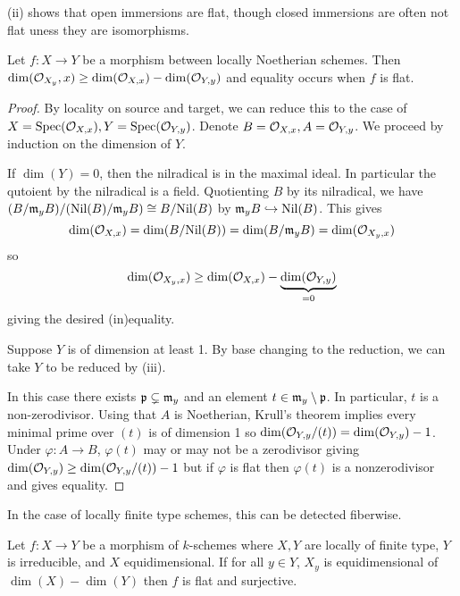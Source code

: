 \begin{example}
     (ii) shows that open immersions are flat, though closed immersions are often not flat uness they are isomorphisms. 
\end{example}
\begin{proposition}\label{prop: dimension criterion for flatness}
    Let $f:X\to Y$ be a morphism between locally Noetherian schemes. Then $\dim(\mathcal{O}_{X_{y}},x)\geq\dim(\mathcal{O}_{X,x})-\dim(\mathcal{O}_{Y,y})$ and equality occurs when $f$ is flat.
\end{proposition}
\begin{proof}
    By locality on source and target, we can reduce this to the case of $X=\operatorname{Spec}(\mathcal{O}_{X,x}),Y=\operatorname{Spec}(\mathcal{O}_{Y,y})$. Denote $B=\mathcal{O}_{X,x},A=\mathcal{O}_{Y,y}$. We proceed by induction on the dimension of $Y$. 

    If $\dim(Y)=0$, then the nilradical is in the maximal ideal. In particular the qutoient by the nilradical is a field. Quotienting $B$ by its nilradical, we have $(B/\mathfrak{m}_{y}B)/(\mathrm{Nil}(B)/\mathfrak{m}_{y}B)\cong B/\mathrm{Nil}(B)$ by $\mathfrak{m}_{y}B\hookrightarrow\mathrm{Nil}(B)$. This gives 
    $$\dim(\mathcal{O}_{X,x})=\dim(B/\mathrm{Nil}(B))=\dim(B/\mathfrak{m}_{y}B)=\dim(\mathcal{O}_{X_{y},x})$$
    so 
    $$\dim(\mathcal{O}_{X_{y},x})\geq\dim(\mathcal{O}_{X,x})-\underbrace{\dim(\mathcal{O}_{Y,y})}_{=0}$$
    giving the desired (in)equality. 

    Suppose $Y$ is of dimension at least 1. By base changing to the reduction, we can take $Y$ to be reduced by  (iii). 

    In this case there exists $\mathfrak{p}\subsetneq\mathfrak{m}_{y}$ and an element $t\in\mathfrak{m}_{y}\setminus\mathfrak{p}$. In particular, $t$ is a non-zerodivisor. Using that $A$ is Noetherian, Krull's theorem implies every minimal prime over $(t)$ is of dimension 1 so $\dim(\mathcal{O}_{Y,y}/(t))=\dim(\mathcal{O}_{Y,y})-1$. Under $\varphi:A\to B$, $\varphi(t)$ may or may not be a zerodivisor giving $\dim(\mathcal{O}_{Y,y})\geq\dim(\mathcal{O}_{Y,y}/(t))-1$ but if $\varphi$ is flat then $\varphi(t)$ is a nonzerodivisor and gives equality. 
\end{proof}
In the case of locally finite type schemes, this can be detected fiberwise. 
\begin{corollary}\label{corr: fiberwise flatness}
    Let $f:X\to Y$ be a morphism of $k$-schemes where $X,Y$ are locally of finite type, $Y$ is irreducible, and $X$ equidimensional. If for all $y\in Y$, $X_{y}$ is equidimensional of $\dim(X)-\dim(Y)$ then $f$ is flat and surjective. 
\end{corollary}
